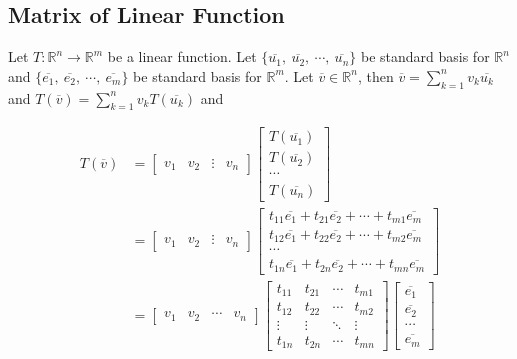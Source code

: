 \subsection{Matrix of Linear Function}
	Let $T : \mathbb{R}^n \to \mathbb{R}^m$ be a linear function.
	Let $\{\overline{u_1},\ \overline{u_2},\ \cdots,\ \overline{u_n}\}$ be standard basis for $\mathbb{R}^n$ and  $\{\overline{e_1},\ \overline{e_2},\ \cdots,\ \overline{e_m}\}$ be standard basis for $\mathbb{R}^m$.
	Let $\overline{v} \in \mathbb{R}^n$, then $\overline{v} = \sum_{k=1}^n v_k\overline{u_k}$ and $T(\overline{v}) = \sum_{k=1}^n v_k T(\overline{u_k})$ and
\begin{commentary}
\begin{align*}
	T(\overline{v}) & =  \begin{bmatrix} v_1 & v_2 & \vdots & v_n  \end{bmatrix} \begin{bmatrix} T(\overline{u_1}) \\ T(\overline{u_2}) \\ \cdots \\ T(\overline{u_n}) \end{bmatrix} \\
	& =  \begin{bmatrix} v_1 & v_2 & \vdots & v_n  \end{bmatrix}\begin{bmatrix} t_{11}\overline{e_1}+t_{21}\overline{e_2}+\cdots+t_{m1}\overline{e_m} \\ t_{12}\overline{e_1}+t_{22}\overline{e_2}+\cdots+t_{m2}\overline{e_m} \\ \cdots \\ t_{1n}\overline{e_1}+t_{2n}\overline{e_2}+\cdots+t_{mn}\overline{e_m} \end{bmatrix} \\
	& = \begin{bmatrix} v_1 & v_2 & \cdots & v_n  \end{bmatrix} \begin{bmatrix} t_{11} & t_{21} & \cdots & t_{m1} \\ t_{12} & t_{22} & \cdots & t_{m2} \\ \vdots & \vdots & \ddots & \vdots \\ t_{1n} & t_{2n} & \cdots & t_{mn} \end{bmatrix} \begin{bmatrix} \overline{e_1} \\ \overline{e_2} \\ \cdots \\ \overline{e_m} \end{bmatrix} \\

\end{align*}
\end{commentary}
